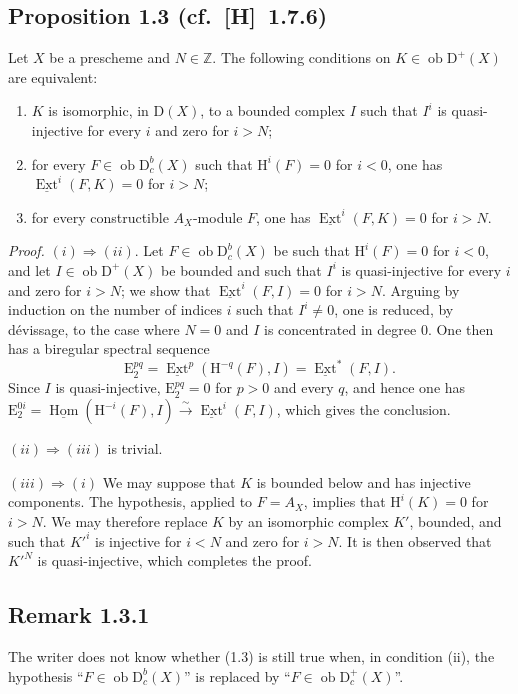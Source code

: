 \documentclass[11pt]{article}
\renewcommand{\H}{\mathrm{H}}
\DeclareMathOperator{\Hom}{Hom}
\DeclareMathOperator{\Ext}{Ext}
\newcommand{\D}{\mathrm{D}}
\newcommand{\Z}{\mathbb{Z}}
\newcommand{\E}{\mathrm{E}}
\newcommand{\ob}{\operatorname{ob}}
\providecommand{\Hom}{\operatorname{Hom}}
\providecommand{\ob}{\operatorname{ob}}
\providecommand{\Z}{\mathbb Z}
\providecommand{\Hom}{\operatorname{Hom}}
\begin{document}
\subsection*{Proposition 1.3 {\normalfont (cf.~[H]~1.7.6)}}
Let $X$ be a prescheme and $N \in \Z$. The following conditions on $K \in \ob \D^{+}(X)$ are equivalent:
\begin{enumerate}[label=(\roman*)]
\item $K$ is isomorphic, in $\D(X)$, to a bounded complex $I$ such that $I^i$ is quasi-injective for every $i$ and zero for $i > N$;
\item for every $F \in \ob \D_c^{b}(X)$ such that $\H^i(F) = 0$ for $i < 0$, one has $\underline{\Ext}^i(F,K) = 0$ for $i > N$;
\item for every constructible $A_X$-module $F$, one has $\underline{\Ext}^i(F,K) = 0$ for $i > N$.
\end{enumerate}

\emph{Proof.} $(i) \Rightarrow (ii)$. Let $F \in \ob \D_c^{b}(X)$ be such that $\H^i(F) = 0$ for $i < 0$, and let $I \in \ob \D^{+}(X)$ be bounded and such that $I^i$ is quasi-injective for every $i$ and zero for $i > N$; we show that $\underline{\Ext}^i(F,I) = 0$ for $i > N$. Arguing by induction on the number of indices $i$ such that $I^i \neq 0$, one is reduced, by dévissage, to the case where $N = 0$ and $I$ is concentrated in degree $0$. One then has a biregular spectral sequence
\[
\E_2^{pq} = \underline{\Ext}^p(\H^{-q}(F),I) = \underline{\Ext}^{*}(F,I).
\]
Since $I$ is quasi-injective, $\E_2^{pq} = 0$ for $p > 0$ and every $q$, and hence one has $\E_2^{0i} = \underline{\Hom}(\H^{-i}(F),I) \xrightarrow{\sim} \underline{\Ext}^i(F,I)$, which gives the conclusion.

$(ii) \Rightarrow (iii)$ is trivial.

$(iii) \Rightarrow (i)$ We may suppose that $K$ is bounded below and has injective components. The hypothesis, applied to $F = A_X$, implies that $\H^i(K) = 0$ for $i > N$. We may therefore replace $K$ by an isomorphic complex $K'$, bounded, and such that $K'^i$ is injective for $i < N$ and zero for $i > N$. It is then observed that $K'^N$ is quasi-injective, which completes the proof.

\subsection*{Remark 1.3.1}
The writer does not know whether (1.3) is still true when, in condition (ii), the hypothesis ``$F \in \ob \D_c^{b}(X)$'' is replaced by ``$F \in \ob \D_c^{+}(X)$''.
\end{document}
